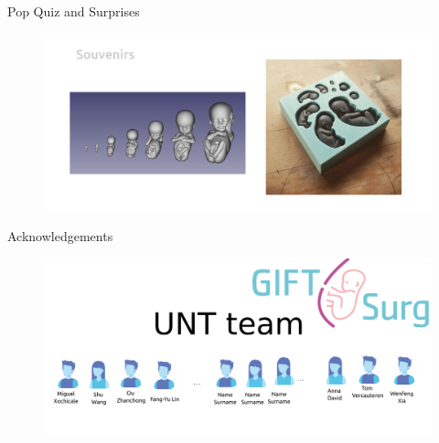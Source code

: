 {
\begin{frame}{Pop Quiz and Surprises}
  \begin{figure}
  \centering
  \includegraphics[width=1.0\textwidth]{./figures/evaluation-souvenirs/versions/drawing-v01}
  \end{figure}

\end{frame}
}



{
\begin{frame}{Acknowledgements}

  \begin{figure}
  \centering
  \includegraphics[width=1.0\textwidth]{./figures/team/versions/drawing-v02.png}
  \end{figure}

\end{frame}
}